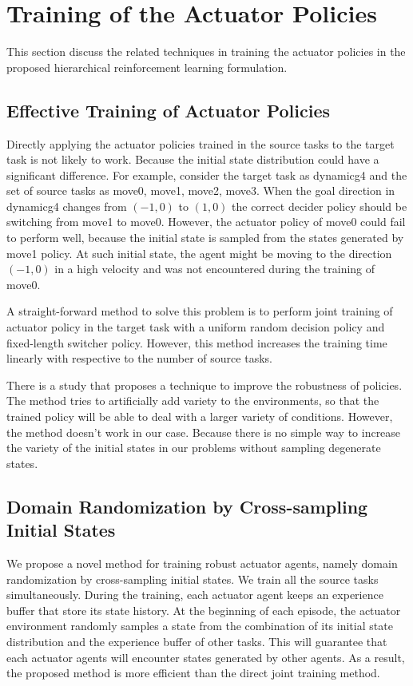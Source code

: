\section{Training of the Actuator Policies}
This section discuss the related techniques in training the actuator policies in the proposed hierarchical reinforcement learning formulation.
\subsection{Effective Training of Actuator Policies}
Directly applying the actuator policies trained in the source tasks to the target task is not likely to work. Because the initial state distribution could have a significant difference.
For example, consider the target task as dynamicg4 and the set of source tasks as move0, move1, move2, move3. When the goal direction in dynamicg4 changes from $(-1,0)$ to $(1,0)$ the correct decider policy should be switching from move1 to move0. However, the actuator policy of move0 could fail to perform well, because the initial state is sampled from the states generated by move1 policy. At such initial state, the agent might be moving to the direction $(-1,0)$ in a high velocity and was not encountered during the training of move0.

A straight-forward method to solve this problem is to perform joint training of actuator policy in the target task with a uniform random decision policy and fixed-length switcher policy. However, this method increases the training time linearly with respective to the number of source tasks.

There is a study \cite{tobin2017domain} that proposes a technique to improve the robustness of policies. The method tries to artificially add variety to the environments, so that the trained policy will be able to deal with a larger variety of conditions. However, the method doesn't work in our case. Because there is no simple way to increase the variety of the initial states in our problems without sampling degenerate states. 

\subsection{Domain Randomization by Cross-sampling Initial States}
We propose a novel method for training robust actuator agents, namely domain randomization by cross-sampling initial states. We train all the source tasks simultaneously. During the training, each actuator agent keeps an experience buffer that store its state history. At the beginning of each episode, the actuator environment randomly samples a state from the combination of its initial state distribution and the experience buffer of other tasks. This will guarantee that each actuator agents will encounter states generated by other agents. As a result, the proposed method is more efficient than the direct joint training method.
